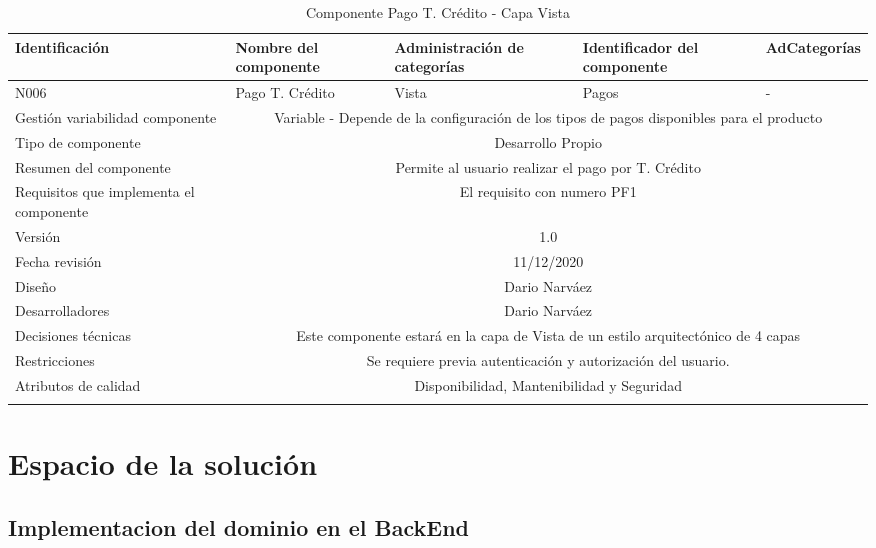 \documentclass[10pt,a4paper,openany]{book}
\begin{document}
\begin{longtable}{|p{3cm}|p{3cm}|p{3cm}|p{3cm}|p{3cm}|} \hline
Identificación & Nombre del componente & Administración de categorías & Identificador del componente & AdCategorías \\[0.5ex] \hline
N006& Pago T. Crédito& Vista& Pagos& -\\[0.5ex] \hline
Gestión variabilidad componente & \multicolumn{4}{|c|}{{Variable - Depende de la configuración de los tipos de pagos disponibles para el producto}} \\ \hline
Tipo de componente & \multicolumn{4}{|c|}{Desarrollo Propio} \\ \hline
Resumen del componente & \multicolumn{4}{|c|}{Permite al usuario realizar el pago por T. Crédito} \\ \hline
Requisitos que implementa el componente & \multicolumn{4}{|c|}{El requisito con numero PF1 } \\ \hline
Versión & \multicolumn{4}{|c|}{1.0 } \\ \hline
Fecha revisión & \multicolumn{4}{|c|}{ 11/12/2020} \\ \hline
Diseño & \multicolumn{4}{|c|}{Dario Narváez} \\ \hline
Desarrolladores & \multicolumn{4}{|c|}{Dario Narváez} \\ \hline
Decisiones técnicas & \multicolumn{4}{|c|}{Este componente estará en la capa de Vista de un estilo arquitectónico de 4 capas  } \\ \hline
Restricciones & \multicolumn{4}{|c|}{Se requiere previa autenticación y autorización del usuario.} \\ \hline
Atributos de calidad & \multicolumn{4}{|c|}{Disponibilidad, Mantenibilidad y Seguridad} \\ \hline
\caption{Componente Pago T. Crédito - Capa Vista}
\label{table:t6}
\end{longtable}

\chapter{Espacio de la solución}
\section{Implementacion del dominio en el BackEnd}
\end{document}
